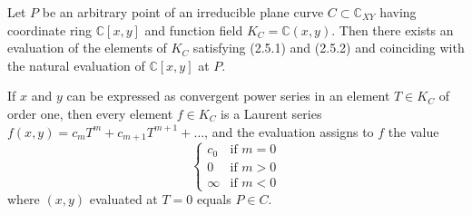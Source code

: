 Let $P$ be an arbitrary point of an irreducible plane curve $C \subset \mathbb{C}_{XY}$ having coordinate ring $\mathbb{C}[x, y]$ and function field $K_C = \mathbb{C}(x, y)$. Then there exists an evaluation of the elements of $K_C$ satisfying (2.5.1) and (2.5.2) and coinciding with the natural evaluation of $\mathbb{C}[x, y]$ at $P$.

If $x$ and $y$ can be expressed as convergent power series in an element $T \in K_C$ of order one, then every element $f \in K_C$ is a Laurent series $f(x, y) = c_m T^m + c_{m+1} T^{m+1} + \ldots$, and the evaluation assigns to $f$ the value
$$\begin{cases} c_0 & \text{if } m = 0 \\ 0 & \text{if } m > 0 \\ \infty & \text{if } m < 0 \end{cases}$$
where $(x, y)$ evaluated at $T = 0$ equals $P \in C$.
